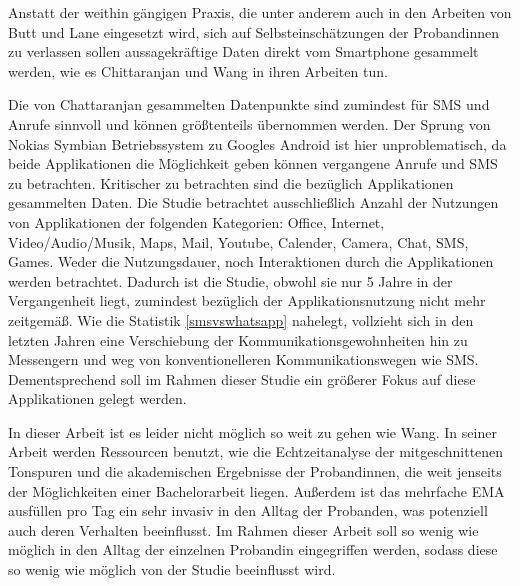 Anstatt der weithin gängigen Praxis, die unter anderem auch in den Arbeiten von Butt \cite{butt2008personality} und Lane \cite{lane2011impact}
eingesetzt wird, sich auf Selbsteinschätzungen der Probandinnen zu verlassen sollen aussagekräftige Daten direkt vom Smartphone gesammelt werden, 
wie es Chittaranjan \cite{chittaranjan2011s} und Wang \cite{wang2014istudentlife} in ihren Arbeiten tun.
\par
Die von Chattaranjan gesammelten Datenpunkte sind zumindest für SMS und Anrufe sinnvoll und können größtenteils übernommen werden.
Der Sprung von Nokias Symbian Betriebssystem zu Googles Android ist hier unproblematisch, da beide Applikationen die Möglichkeit geben können
vergangene Anrufe und SMS zu betrachten.
Kritischer zu betrachten sind die bezüglich Applikationen gesammelten Daten.
Die Studie betrachtet ausschließlich Anzahl der Nutzungen von Applikationen der folgenden Kategorien:
Office, Internet, Video/Audio/Musik, Maps, Mail, Youtube, Calender, Camera, Chat, SMS, Games.
Weder die Nutzungsdauer, noch Interaktionen durch die Applikationen werden betrachtet. 
Dadurch ist die Studie, obwohl sie nur 5 Jahre in der Vergangenheit liegt, zumindest bezüglich der Applikationsnutzung nicht mehr zeitgemäß.
Wie die Statistik \ref{smsvswhatsapp} nahelegt, vollzieht sich in den letzten Jahren eine Verschiebung der Kommunikationsgewohnheiten hin zu Messengern und weg von konventionelleren Kommunikationswegen wie SMS.
Dementsprechend soll im Rahmen dieser Studie ein größerer Fokus auf diese Applikationen gelegt werden.
\par
In dieser Arbeit ist es leider nicht möglich so weit zu gehen wie Wang.
In seiner Arbeit werden Ressourcen benutzt, wie die Echtzeitanalyse der mitgeschnittenen Tonspuren und die akademischen Ergebnisse der Probandinnen, die weit jenseits der Möglichkeiten einer Bachelorarbeit liegen.
Außerdem ist das mehrfache EMA ausfüllen pro Tag ein sehr invasiv in den Alltag der Probanden, was potenziell auch deren Verhalten beeinflusst.
Im Rahmen dieser Arbeit soll so wenig wie möglich in den Alltag der einzelnen Probandin eingegriffen werden, sodass diese so wenig wie möglich von der Studie beeinflusst wird.


